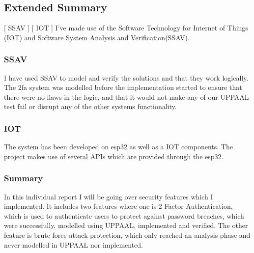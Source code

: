 \subsection*{Extended Summary}
[ SSAV ] [ IOT ]
\newline
I've made use of the Software Technology for Internet of Things (IOT) and Software System Analysis and Verification(SSAV).

\subsubsection{SSAV}
I have used SSAV to model and verify the solutions and that they work logically. The \gls{2fa} system was modelled before the implementation started to ensure that there were no flaws in the logic, and that it would not make any of our UPPAAL test fail or disrupt any of the other systems functionality.

\subsubsection{IOT}
The system has been developed on esp32 as well as a IOT components. The project makes use of several APIs which are provided through the esp32.

\subsubsection{Summary}
In this individual report I will be going over security features which I implemented. It includes two features where one is 2 Factor Authentication, which is used to authenticate users to protect against password breaches, which were successfully, modelled using UPPAAL, implemented and verified. The other feature is brute force attack protection, which only reached an analysis phase and never modelled in UPPAAL nor implemented.